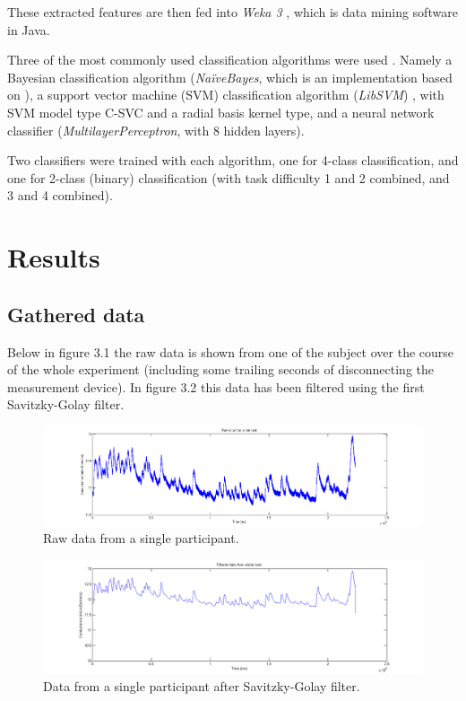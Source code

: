 \documentclass[11pt,leqno,a4paper]{report} %
\begin{document}
These extracted features are then fed into \emph{Weka 3} \citep{weka}, which is data mining software in Java. 


Three of the most commonly used classification algorithms were used \citep{small}. Namely a Bayesian classification algorithm (\emph{Na\"iveBayes}, which is an implementation based on \citep{john1995estimating}), a support vector machine (SVM) classification algorithm (\emph{LibSVM}) \citep{libsvm}, with SVM model type C-SVC and a radial basis kernel type, and a neural network classifier (\emph{MultilayerPerceptron}, with 8 hidden layers). 

Two classifiers  were trained with each algorithm, one for 4-class classification, and one for 2-class (binary) classification (with task difficulty 1 and 2 combined, and 3 and 4 combined).


\chapter{Results}

\section{Gathered data}

Below in figure 3.1 the raw data is shown from one of the subject over the course of the whole experiment (including some trailing seconds of disconnecting the measurement device). In figure 3.2 this data has been filtered using the first Savitzky-Golay filter.


\begin{figure}[H]
  \centering
    \hspace*{-.25\textwidth}   
    \includegraphics[width=1.5\textwidth]{measurements/raw.png}
  \caption{Raw data from a single participant.}
\end{figure}

\begin{figure}[H]
  \centering
 	\hspace*{-.25\textwidth}   
 	\includegraphics[width=1.5\textwidth]{measurements/filtered.png}
  \caption{Data from a single participant after Savitzky-Golay filter.}
\end{figure}
\end{document}
